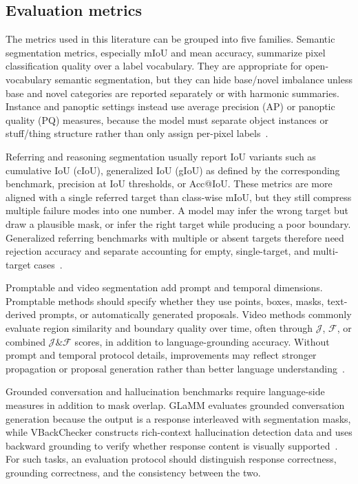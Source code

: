 \subsection{Evaluation metrics}

The metrics used in this literature can be grouped into five families. Semantic segmentation metrics, especially mIoU and mean accuracy, summarize pixel classification quality over a label vocabulary. They are appropriate for open-vocabulary semantic segmentation, but they can hide base/novel imbalance unless base and novel categories are reported separately or with harmonic summaries. Instance and panoptic settings instead use average precision (AP) or panoptic quality (PQ) measures, because the model must separate object instances or stuff/thing structure rather than only assign per-pixel labels~\citep{lin2014microsoft,kirillov2019panoptic}.

Referring and reasoning segmentation usually report IoU variants such as cumulative IoU (cIoU), generalized IoU (gIoU) as defined by the corresponding benchmark, precision at IoU thresholds, or Acc@IoU. These metrics are more aligned with a single referred target than class-wise mIoU, but they still compress multiple failure modes into one number. A model may infer the wrong target but draw a plausible mask, or infer the right target while producing a poor boundary. Generalized referring benchmarks with multiple or absent targets therefore need rejection accuracy and separate accounting for empty, single-target, and multi-target cases~\citep{xiaGsvaGeneralizedSegmentation2024,huangPixelsLogicPerceptionReasoning2026}.

Promptable and video segmentation add prompt and temporal dimensions. Promptable methods should specify whether they use points, boxes, masks, text-derived prompts, or automatically generated proposals. Video methods commonly evaluate region similarity and boundary quality over time, often through $\mathcal{J}$, $\mathcal{F}$, or combined $\mathcal{J}\&\mathcal{F}$ scores, in addition to language-grounding accuracy. Without prompt and temporal protocol details, improvements may reflect stronger propagation or proposal generation rather than better language understanding~\citep{atharVicasDatasetCombining2025,munasingheVideoglammLargeMultimodal2025,liangReferdinoReferringVideo2025}.

Grounded conversation and hallucination benchmarks require language-side measures in addition to mask overlap. GLaMM evaluates grounded conversation generation because the output is a response interleaved with segmentation masks, while VBackChecker constructs rich-context hallucination detection data and uses backward grounding to verify whether response content is visually supported~\citep{rasheedGlammPixelGrounding2024,guoSeeingBelievingRichContext2026}. For such tasks, an evaluation protocol should distinguish response correctness, grounding correctness, and the consistency between the two.

